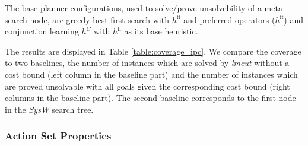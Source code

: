 The base planner configurations, used to solve/prove unsolvebility of a meta search node,
are greedy best first search with $h^{\text{ff}}$ and preferred operators ($h^{\text{ff}}$) and  
conjunction learning $h^C$ with $h^{\text{ff}}$ as its base heuristic. 

The results are displayed in Table \ref{table:coverage_ipc}.
We compare the coverage to two baselines, the number of instances which are solved by \emph{lmcut} without
a cost bound (left column in the baseline part) and the number of instances which are proved
unsolvable with all goals given the corresponding cost bound (right columns in the baseline part). 
The second baseline corresponds to the first node in the \emph{SysW} search tree.



\setlength{\tabcolsep}{2pt}
\renewcommand{\arraystretch}{0.8}
\begin{figure*}[ht]
	\centering  
	\caption{
		Benchmark: oversubscription IPC
		domains with bound $ = x \cdot $ optimal cost with $
		x \in \{0.25, 0.5, 0.75\}$, solvable with lmcut with no cost bound in 
		30 min and with less then 31 goal facts(limitation of implementation).
	}
	\label{table:coverage_ipc}
\end{figure*}



\subsubsection*{Action Set Properties}


